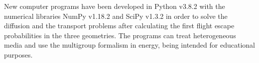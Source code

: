 \documentclass{ictt26}
\begin{document}
%
%
%

New computer programs have been developed in Python v3.8.2 with the numerical libraries NumPy v1.18.2 and SciPy v1.3.2 in order to solve the diffusion and the transport problems after calculating the first flight escape probabilities in the three geometries. The programs can treat heterogeneous media and use the multigroup formalism in energy, being intended for educational purposes.
\end{document}

